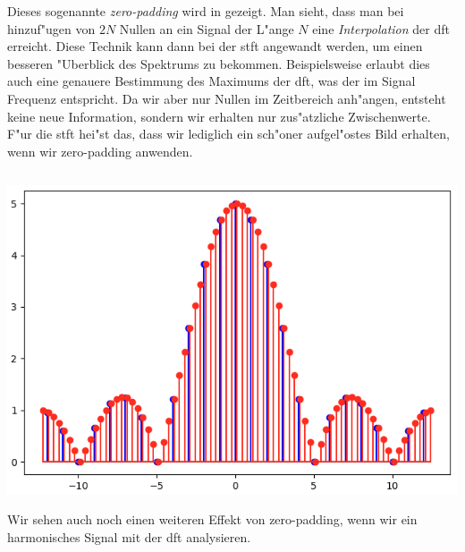 Dieses sogenannte \emph{zero-padding} wird in  gezeigt.
Man sieht, dass man bei hinzuf"ugen von $2N$ Nullen an ein Signal der L"ange $N$ eine \emph{Interpolation} der \gls{dft} erreicht.
Diese Technik kann dann  bei der \gls{stft} angewandt werden, um einen besseren "Uberblick des Spektrums zu bekommen.
Beispielsweise erlaubt dies auch eine genauere Bestimmung des Maximums der \gls{dft}, was der im Signal  Frequenz entspricht.
Da wir aber nur Nullen im Zeitbereich anh"angen, entsteht keine neue Information, sondern wir erhalten nur zus"atzliche Zwischenwerte.
F"ur die \gls{stft} hei"st das, dass wir lediglich ein sch"oner aufgel"ostes Bild erhalten, wenn wir zero-padding anwenden.
%
\begin{listing}[ht]
    \noindent
    \begin{minipage}{0.51\textwidth}
        \strut\vspace*{-\baselineskip}\newline
        \inputminted[firstline=4, lastline=20]{python3}{code/stft_zp.py}
    \end{minipage}%
    \begin{minipage}{0.48\textwidth}
        \strut\vspace*{-\baselineskip}\newline
        \includegraphics[width=\textwidth]{code/stft_zp.png}
    \end{minipage}
    \label{py:stft_zp}
\end{listing}
%
%
\clearpage
Wir sehen auch noch einen weiteren Effekt von zero-padding, wenn wir ein harmonisches Signal mit der \gls{dft} analysieren.
